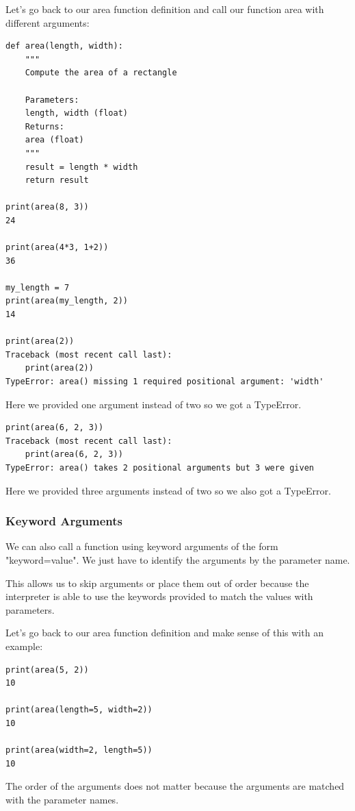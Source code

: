 \documentclass{article}
\begin{document}
Let's go back to our area function definition and call our function area with different arguments:

\begin{lstlisting}
def area(length, width):
    """
    Compute the area of a rectangle
 
    Parameters:
    length, width (float)
    Returns:
    area (float)
    """
    result = length * width
    return result
 
print(area(8, 3))    
24
 
print(area(4*3, 1+2))
36
 
my_length = 7
print(area(my_length, 2))
14
 
print(area(2))
Traceback (most recent call last):
    print(area(2))
TypeError: area() missing 1 required positional argument: 'width'
\end{lstlisting}

Here we provided one argument instead of two so we got a TypeError.

\begin{lstlisting}
print(area(6, 2, 3))
Traceback (most recent call last):
    print(area(6, 2, 3))
TypeError: area() takes 2 positional arguments but 3 were given
\end{lstlisting}

Here we provided three arguments instead of two so we also got a TypeError.

\subsubsection{Keyword Arguments}

We can also call a function using keyword arguments of the form "keyword=value". We just have to identify the arguments by the parameter name.

This allows us to  skip arguments or place them out of order because the interpreter is able to use the keywords provided to match the values with parameters. 

Let's go back to our area function definition and make sense of this with an example:

\begin{lstlisting}
print(area(5, 2))    
10
 
print(area(length=5, width=2))    
10
 
print(area(width=2, length=5))    
10
\end{lstlisting}

The order of the arguments does not matter because the arguments are matched with the parameter names. 
 
\end{document}
